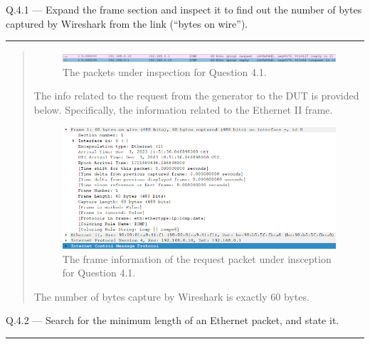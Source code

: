 \documentclass{article}
\newcommand\Que[2]{%
   \begin{samepage}
   \leavevmode\par
   \noindent
   Q.#1 --- #2\par\vspace{10pt}\hrule\vspace{10pt}
   \end{samepage}}
\newenvironment{ans}
   {\fbox{Answer}\begin{quote}\nopagebreak}
   {\end{quote}}
\begin{document}
\Que{4.1}{Expand the frame section and inspect it to find out
the number of bytes captured by Wireshark from the link (``bytes
on wire'').}

\begin{ans}
\begin{figure}[H]
   \centering
   \includegraphics[width=16cm]{data/q4.1-packets-under-inspection.png}
   \caption{The packets under inspection for Question 4.1.}
\end{figure}

The info related to the request from the generator to the DUT is
provided below. Specifically, the information related to the
Ethernet II frame.

\begin{figure}[H]
   \centering
   \includegraphics[width=16cm]{data/q4.1-request-info.png}
   \caption{The frame information of the request packet under
   insception for Question 4.1.}
\end{figure}

The number of bytes capture by Wireshark is exactly 60 bytes.
\end{ans}

\Que{4.2}{Search for the minimum length of an Ethernet packet,
and state it.}
\end{document}
